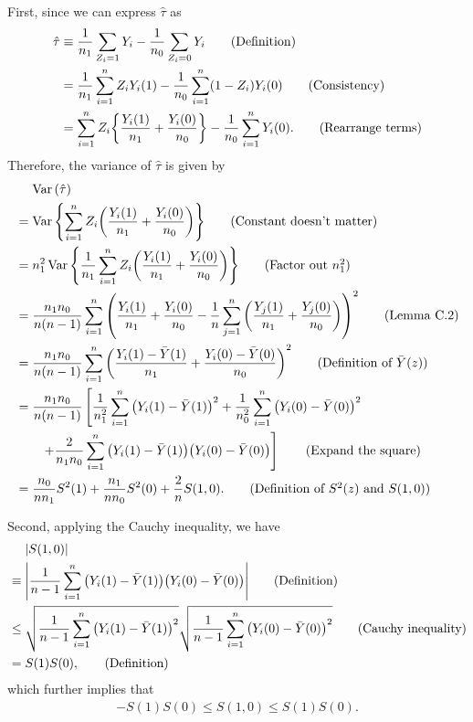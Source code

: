 \documentclass[10pt]{article}
\begin{document}
First, since we can express $\hat{\tau}$ as
\begin{align*}
  \hat{\tau} 
  &\equiv \frac{1}{n_1} \sum_{Z_i = 1} Y_i - \frac{1}{n_0} \sum_{Z_i = 0} Y_i \tag{Definition} \\
  &= \frac{1}{n_1} \sum_{i=1}^n Z_i Y_i(1) - \frac{1}{n_0} \sum_{i=1}^n (1 - Z_i) Y_i(0) \tag{Consistency} \\
  &= \sum_{i=1}^n Z_i {\left\lbrace \frac{Y_i(1)}{n_1} + \frac{Y_i(0)}{n_0} \right\rbrace} - \frac{1}{n_0} \sum_{i=1}^n Y_i(0). \tag{Rearrange terms}
\end{align*}
Therefore, the variance of $\hat{\tau}$ is given by 
\begin{align*}
  &\mathrel{\phantom{=}} \Var\bp{\hat{\tau}} \\
  &= \Var\bc{\sum_{i=1}^n Z_i \bp{\frac{Y_i(1)}{n_1} + \frac{Y_i(0)}{n_0}}} \tag{Constant doesn't matter} \\
  &= n_1^2 \Var\bc{\frac{1}{n_1} \sum_{i=1}^n Z_i \bp{\frac{Y_i(1)}{n_1} + \frac{Y_i(0)}{n_0}}} \tag{Factor out $n_1^2$} \\ 
  &= \frac{n_1 n_0}{n(n - 1)} \sum_{i=1}^n \bp{\frac{Y_i(1)}{n_1} + \frac{Y_i(0)}{n_0} - \frac{1}{n} \sum_{j=1}^n \bp{\frac{Y_j(1)}{n_1} + \frac{Y_j(0)}{n_0}}}^2 \tag{Lemma C.2} \\
  &= \frac{n_1 n_0}{n(n - 1)} \sum_{i=1}^n \bp{\frac{Y_i(1) - \bar{Y}(1)}{n_1} + \frac{Y_i(0) - \bar{Y}(0)}{n_0}}^2 \tag{Definition of $\bar{Y}(z)$} \\
  &= \frac{n_1 n_0}{n (n - 1)} \left[\frac{1}{n_1^2} \sum_{i=1}^n \bp{Y_i(1) - \bar{Y}(1)}^2 
    + \frac{1}{n_0^2} \sum_{i=1}^n \bp{Y_i(0) - \bar{Y}(0)}^2 \right. \\ 
  &\qquad \left. + \frac{2}{n_1 n_0} \sum_{i=1}^n \bp{Y_i(1) - \bar{Y}(1)} \bp{Y_i(0) - \bar{Y}(0)}
    \right] \tag{Expand the square} \\
  &= \frac{n_0}{n n_1} S^2(1) + \frac{n_1}{n n_0} S^2(0) + \frac{2}{n} S(1, 0). \tag{Definition of $S^2(z)$ and $S(1, 0)$}
\end{align*}
  
Second, applying the Cauchy inequality, we have
\begin{align*}
  &\mathrel{\phantom{=}} {\left| S(1, 0) \right|} \\
  &\equiv {\left| \frac{1}{n - 1} \sum_{i=1}^n {\left( Y_i(1) - \bar{Y}(1) \right)} {\left( Y_i(0) - \bar{Y}(0) \right)} \right|} \tag{Definition} \\
  &\leq \sqrt{\frac{1}{n - 1} \sum_{i=1}^n {\left( Y_i(1) - \bar{Y}(1) \right)}^2} 
    \sqrt{\frac{1}{n - 1} \sum_{i=1}^n {\left( Y_i(0) - \bar{Y}(0) \right)}^2} \tag{Cauchy inequality} \\
  &= S(1) S(0), \tag{Definition}
\end{align*}
which further implies that
\begin{align*}
  -S(1) S(0) \leq S(1, 0) \leq S(1) S(0).
\end{align*}
\end{document}
